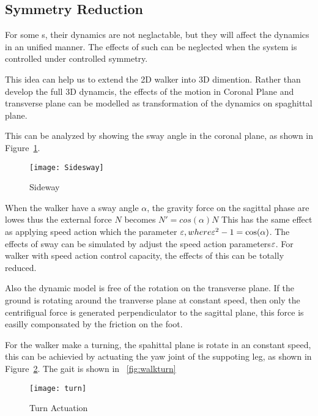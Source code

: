 {%
\subsection{Symmetry Reduction}
For some \dof s, their dynamics are not neglactable, but they will affect the dynamics in an unified manner.
The effects of such \dof can be neglected when the system is controlled under controlled symmetry.

This idea can help us to extend the 2D walker into 3D dimention.
Rather than develop the full 3D dynamcis, the effects of the motion in Coronal Plane and transverse plane can be modelled as transformation of the dynamics on spaghittal plane.


This can be analyzed by showing the sway angle in the coronal plane, as shown in Figure~\ref{fig:sidesway}.
\begin{figure}[!htbp]
  \begin{center}
      \texttt{[image: Sidesway]}
    \caption{Sideway}
    \label{fig:sidesway}
\end{center}
\end{figure}

When the walker have a sway angle $\alpha$, the gravity force on the sagittal phase are lowes thus the external force $N$ becomes $N'=cos(\alpha)N$
This has the same effect as applying speed action which the parameter $\varepsilon, where \varepsilon^2-1=\cos(\alpha)$.
The effects of sway can be simulated by adjust the speed action parameters$\varepsilon$.
For walker with speed action control capacity, the effects of this \dof can be totally reduced.


Also the dynamic model is free of the rotation on the transverse plane.
If the ground is rotating around the tranverse plane at constant speed, then only the centrifigual force is generated perpendiculator to the sagittal plane, this force is easilly componsated by the friction on the foot.

For the walker make a turning, the spahittal plane is rotate in an constant speed, this can be achievied by actuating the yaw joint of the suppoting leg, as shown in Figure~\ref{fig:turn}.
The gait is shown in ~\ref{fig:walkturn}

\begin{figure}[!htbp]
  \begin{center}
      \texttt{[image: turn]}
    \caption{Turn Actuation}
    \label{fig:turn}
\end{center}
\end{figure}



}
